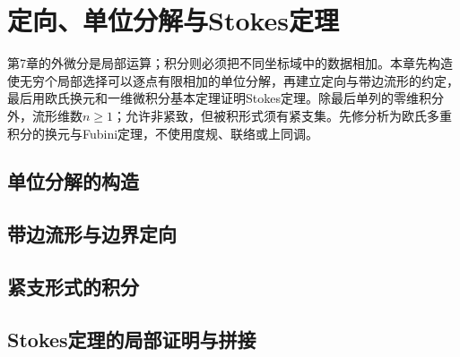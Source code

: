 \chapter{定向、单位分解与Stokes定理}
\label{ch:08-integration}

第7章的外微分是局部运算；积分则必须把不同坐标域中的数据相加。本章先构造使无穷个局部选择可以逐点有限相加的单位分解，再建立定向与带边流形的约定，最后用欧氏换元和一维微积分基本定理证明Stokes定理。除最后单列的零维积分外，流形维数$n\geq1$；允许非紧致，但被积形式须有紧支集。先修分析为欧氏多重积分的换元与Fubini定理，不使用度规、联络或上同调。

\section{单位分解的构造}


\section{带边流形与边界定向}


\section{紧支形式的积分}


\section{Stokes定理的局部证明与拼接}



